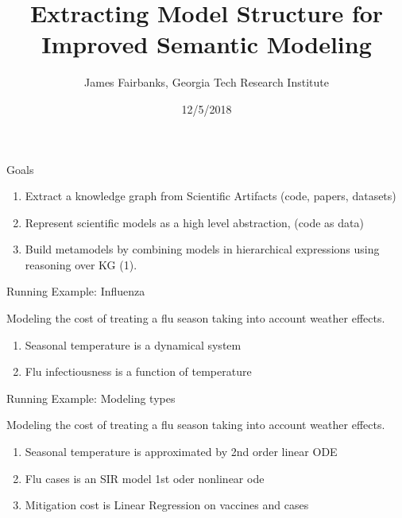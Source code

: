 \documentclass[ignorenonframetext,]{beamer}
\title{Extracting Model Structure for Improved Semantic Modeling}
\date{12/5/2018}
\author{James Fairbanks, Georgia Tech Research Institute}
\providecommand{\tightlist}{%
  \setlength{\itemsep}{0pt}\setlength{\parskip}{0pt}}
\begin{document}
\begin{frame}
\maketitle{}
\end{frame}

\begin{frame}{Goals}
\protect\hypertarget{goals}{}

\begin{enumerate}
\tightlist
\item
  Extract a knowledge graph from Scientific Artifacts (code, papers,
  datasets)
\item
  Represent scientific models as a high level abstraction, (code as data)
\item
  Build metamodels by combining models in hierarchical expressions using
  reasoning over KG (1).
\end{enumerate}

\end{frame}

\begin{frame}{Running Example: Influenza}
\protect\hypertarget{running-example-influenza}{}

Modeling the cost of treating a flu season taking into account weather
effects.

\begin{enumerate}
\tightlist
\item
  Seasonal temperature is a dynamical system
\item
  Flu infectiousness is a function of temperature
\end{enumerate}

\end{frame}

\begin{frame}{Running Example: Modeling types}
\protect\hypertarget{running-example-modeling-types}{}

Modeling the cost of treating a flu season taking into account weather
effects.

\begin{enumerate}
\tightlist
\item
  Seasonal temperature is approximated by 2nd order linear ODE
\item
  Flu cases is an SIR model 1st oder nonlinear ode
\item
  Mitigation cost is Linear Regression on vaccines and cases
\end{enumerate}

\end{frame}
\end{document}
